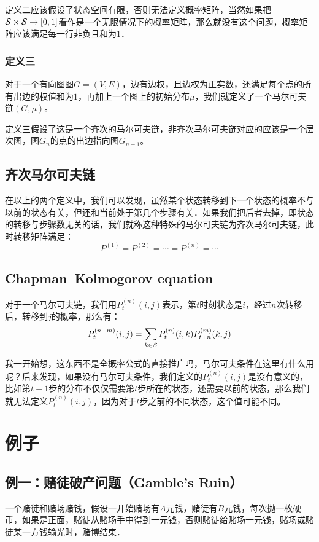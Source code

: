 		\remark 定义二应该假设了状态空间有限，否则无法定义概率矩阵，当然如果把${\cal S}\times {\cal S} \rightarrow [0,1]$看作是一个无限情况下的概率矩阵，那么就没有这个问题，概率矩阵应该满足每一行非负且和为$1$．
		
		\subsubsection{定义三}
		对于一个有向图图$G = (V,E)$，边有边权，且边权为正实数，还满足每个点的所有出边的权值和为$1$，再加上一个图上的初始分布$\mu$，我们就定义了一个马尔可夫链$(G,\mu)$。
		
		\remark 定义三假设了这是一个齐次的马尔可夫链，非齐次马尔可夫链对应的应该是一个层次图，图$G_n$的点的出边指向图$G_{n+1}$。
		
	\subsection{齐次马尔可夫链}
		在以上的两个定义中，我们可以发现，虽然某个状态转移到下一个状态的概率不与以前的状态有关，但还和当前处于第几个步骤有关．如果我们把后者去掉，即状态的转移与步骤数无关的话，我们就称这种特殊的马尔可夫链为齐次马尔可夫链，此时转移矩阵满足：
		$$
			P^{(1)} = P^{(2)} = \cdots = P^{(n)} = \cdots 
		$$
	\subsection{Chapman–Kolmogorov equation}
		对于一个马尔可夫链，我们用$P_{t}^{(n)}(i,j)$表示，第$t$时刻状态是$i$，经过$n$次转移后，转移到$j$的概率，那么有：
		$$
			P_{t}^{(n+m)}(i,j) = \sum_{k \in \cal S}P_{t}^{(n)}(i,k)P_{t+n}^{(m)}(k,j)
		$$
		
		\remark 我一开始想，这东西不是全概率公式的直接推广吗，马尔可夫条件在这里有什么用呢？后来发现，如果没有马尔可夫条件，我们定义的$P_{t}^{(n)}(i,j)$是没有意义的，比如第$t+1$步的分布不仅仅需要第$t$步所在的状态，还需要以前的状态，那么我们就无法定义$P_{t}^{(n)}(i,j)$，因为对于$t$步之前的不同状态，这个值可能不同。
		
\section{例子} 
		\subsection{例一：赌徒破产问题（Gamble's Ruin）}
		一个赌徒和赌场赌钱，假设一开始赌场有$A$元钱，赌徒有$B$元钱，每次抛一枚硬币，如果是正面，赌徒从赌场手中得到一元钱，否则赌徒给赌场一元钱，赌场或赌徒某一方钱输光时，赌博结束．
		
